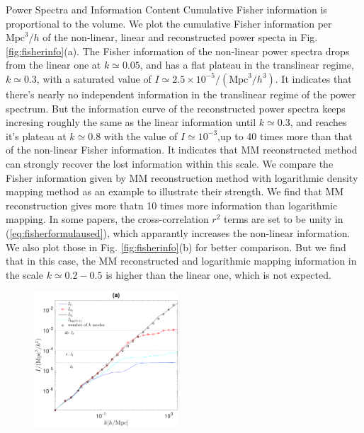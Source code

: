 \begin{section}{Power Spectra and Information Content}
  Cumulative Fisher information is proportional to the volume. We plot the 
cumulative Fisher information per $\mathrm{Mpc}^3/h$ of the non-linear, linear and reconstructed power specta in 
Fig.\ref{fig:fisherinfo}(a). The Fisher information of the non-linear power spectra drops 
from the linear one at $k \simeq 0.05$, and has a flat plateau in the translinear regime, $k\simeq0.3$, with 
a saturated value of $I \simeq 2.5 \times 10^{-5}/(\mathrm{Mpc}^3/h^3)$. It 
indicates that there's nearly no independent information in the translinear regime of the power 
spectrum.
But the information curve of 
the reconstructed power spectra keeps incresing roughly the same as 
the linear information until $k\simeq 0.3$, and reaches it's plateau at $k\simeq 0.8$ with the 
value of $I \simeq  10^{-3}$,up to 40 times more than that of the non-linear Fisher information. 
It indicates that MM reconstructed method can strongly recover the lost information 
within this scale. We compare the Fisher information given by MM reconstruction method with 
logarithmic density mapping method \cite{bib:Mark2009} as an example to illustrate their strength. 
We find that MM reconstruction gives more thatn 10 times more information than logarithmic mapping. 
In some papers, the cross-correlation $r^2$ terms are set to be unity in (\ref{eq:fisherformulaused}), which 
apparantly increases the non-linear information. We also plot those in Fig. \ref{fig:fisherinfo}(b) 
for better comparison. But we find that in this case, the MM reconstructed and logarithmic mapping information in the scale 
$k \simeq 0.2 - 0.5$ is higher than the linear one, which is not expected. 
\begin{figure}
  \includegraphics[width=0.48\textwidth]{fisher_r2_best_analysis-crop.pdf}

\end{figure}
\end{section}
